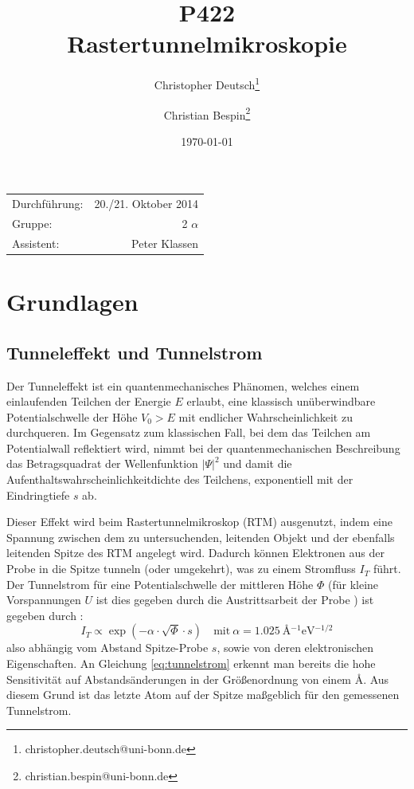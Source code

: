 \documentclass[10pt, a4paper]{article}
\title{P422 \\ Rastertunnelmikroskopie}
\author{Christopher Deutsch\footnote{christopher.deutsch@uni-bonn.de} \and Christian Bespin\footnote{christian.bespin@uni-bonn.de}}
\date{\today}
\begin{document}
  
\maketitle

\begin{center}
\begin{tabular}{l r}
Durchführung: & 20./21. Oktober 2014 \\
Gruppe: & 2 $\alpha$ \\
Assistent: & Peter Klassen
\end{tabular}
\end{center}

\begin{abstract}
\end{abstract}

\tableofcontents
\newpage

\section{Grundlagen}

\subsection{Tunneleffekt und Tunnelstrom}
Der Tunneleffekt ist ein quantenmechanisches Phänomen, welches einem einlaufenden Teilchen der Energie $E$ erlaubt, eine klassisch unüberwindbare Potentialschwelle der Höhe $V_0 > E$ mit endlicher Wahrscheinlichkeit zu durchqueren.
Im Gegensatz zum klassischen Fall, bei dem das Teilchen am Potentialwall reflektiert wird, nimmt bei der quantenmechanischen Beschreibung das Betragsquadrat der Wellenfunktion $|\Psi|^2$ und damit die Aufenthaltswahrscheinlichkeitdichte des Teilchens, exponentiell mit der Eindringtiefe $s$ ab.

Dieser Effekt wird beim Rastertunnelmikroskop (RTM) ausgenutzt, indem eine Spannung zwischen dem zu untersuchenden, leitenden Objekt und der ebenfalls leitenden Spitze des RTM angelegt wird. Dadurch können Elektronen aus der Probe in die Spitze tunneln (oder umgekehrt), was zu einem Stromfluss $I_T$ führt.
Der Tunnelstrom für eine Potentialschwelle der mittleren Höhe $\Phi$ (für kleine Vorspannungen $U$ ist dies gegeben durch die Austrittsarbeit der Probe \cite{colton}) ist gegeben durch \cite{binning}:
\begin{equation}
  I_T \propto \exp(-\alpha \cdot \sqrt{\Phi} \cdot s) \quad \text{mit}\: \alpha = \SI{1,025}{\angstrom^{-1}\electronvolt^{-1/2}}
  \label{eq:tunnelstrom}
\end{equation}
also abhängig vom Abstand Spitze-Probe $s$, sowie von deren elektronischen Eigenschaften.
An Gleichung \ref{eq:tunnelstrom} erkennt man bereits die hohe Sensitivität auf Abstandsänderungen in der Größenordnung von einem \si{\angstrom}.
Aus diesem Grund ist das letzte Atom auf der Spitze maßgeblich für den gemessenen Tunnelstrom.
\end{document}
